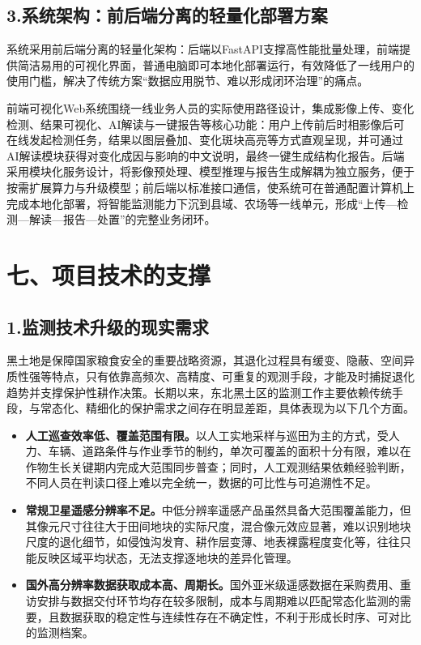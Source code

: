\documentclass[12pt, a4paper]{ctexart}
\begin{document}
\subsection{3.系统架构：前后端分离的轻量化部署方案}

系统采用前后端分离的轻量化架构：后端以FastAPI支撑高性能批量处理，前端提供简洁易用的可视化界面，普通电脑即可本地化部署运行，有效降低了一线用户的使用门槛，解决了传统方案“数据应用脱节、难以形成闭环治理”的痛点。

前端可视化Web系统围绕一线业务人员的实际使用路径设计，集成影像上传、变化检测、结果可视化、AI解读与一键报告等核心功能：用户上传前后时相影像后可在线发起检测任务，结果以图层叠加、变化斑块高亮等方式直观呈现，并可通过AI解读模块获得对变化成因与影响的中文说明，最终一键生成结构化报告。后端采用模块化服务设计，将影像预处理、模型推理与报告生成解耦为独立服务，便于按需扩展算力与升级模型；前后端以标准接口通信，使系统可在普通配置计算机上完成本地化部署，将智能监测能力下沉到县域、农场等一线单元，形成“上传—检测—解读—报告—处置”的完整业务闭环。

\section{七、项目技术的支撑}

\subsection{1.监测技术升级的现实需求}

黑土地是保障国家粮食安全的重要战略资源，其退化过程具有缓变、隐蔽、空间异质性强等特点，只有依靠高频次、高精度、可重复的观测手段，才能及时捕捉退化趋势并支撑保护性耕作决策。长期以来，东北黑土区的监测工作主要依赖传统手段，与常态化、精细化的保护需求之间存在明显差距，具体表现为以下几个方面。

\begin{itemize}
    \item \textbf{人工巡查效率低、覆盖范围有限。}以人工实地采样与巡田为主的方式，受人力、车辆、道路条件与作业季节的制约，单次可覆盖的面积十分有限，难以在作物生长关键期内完成大范围同步普查；同时，人工观测结果依赖经验判断，不同人员在判读口径上难以完全统一，数据的可比性与可追溯性不足。
    \item \textbf{常规卫星遥感分辨率不足。}中低分辨率遥感产品虽然具备大范围覆盖能力，但其像元尺寸往往大于田间地块的实际尺度，混合像元效应显著，难以识别地块尺度的退化细节，如侵蚀沟发育、耕作层变薄、地表裸露程度变化等，往往只能反映区域平均状态，无法支撑逐地块的差异化管理。
    \item \textbf{国外高分辨率数据获取成本高、周期长。}国外亚米级遥感数据在采购费用、重访安排与数据交付环节均存在较多限制，成本与周期难以匹配常态化监测的需要，且数据获取的稳定性与连续性存在不确定性，不利于形成长时序、可对比的监测档案。
\end{itemize}
\end{document}
